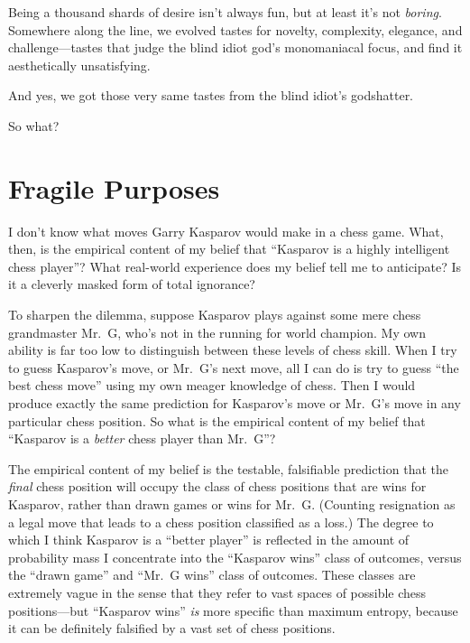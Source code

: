 {{
 Being a thousand shards of desire isn't always
fun, but at least it's not \textit{boring}. Somewhere
along the line, we evolved tastes for novelty, complexity, elegance,
and challenge---tastes that judge the blind idiot god's
monomaniacal focus, and find it aesthetically unsatisfying.}

{
 And yes, we got those very same tastes from the blind
idiot's godshatter.}

{
 So what?}

\myendsectiontext

\chapter{Fragile Purposes}


{
 I don't know what moves Garry Kasparov would make
in a chess game. What, then, is the empirical content of my belief that
``Kasparov is a highly intelligent chess
player''? What real-world experience does my belief
tell me to anticipate? Is it a cleverly masked form of total ignorance?
}

{
 To sharpen the dilemma, suppose Kasparov plays against some mere
chess grandmaster Mr.~G, who's not in the running for
world champion. My own ability is far too low to distinguish between
these levels of chess skill. When I try to guess
Kasparov's move, or Mr.~G's next move,
all I can do is try to guess ``the best chess
move'' using my own meager knowledge of chess. Then I
would produce exactly the same prediction for
Kasparov's move or Mr.~G's move in any
particular chess position. So what is the empirical content of my
belief that ``Kasparov is a \textit{better} chess
player than Mr.~G''?}

{
 The empirical content of my belief is the testable, falsifiable
prediction that the \textit{final} chess position will occupy the class
of chess positions that are wins for Kasparov, rather than drawn games
or wins for Mr.~G. (Counting resignation as a legal move that leads to
a chess position classified as a loss.) The degree to which I think
Kasparov is a ``better player'' is
reflected in the amount of probability mass I concentrate into the
``Kasparov wins'' class of outcomes,
versus the ``drawn game'' and
``Mr.~G wins'' class of outcomes.
These classes are extremely vague in the sense that they refer to vast
spaces of possible chess positions---but ``Kasparov
wins'' \textit{is} more specific than maximum
entropy, because it can be definitely falsified by a vast set of chess
positions.}

}
